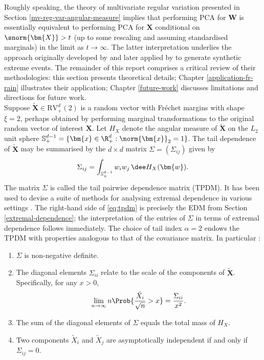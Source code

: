 \documentclass[en-GB, a4paper, nobind]{templates/bathreport}
\begin{document}
Roughly speaking, the theory of multivariate regular variation presented in Section \ref{mv-reg-var-angular-measure} implies that performing PCA for \(\bm{W}\) is essentially equivalent to performing PCA for \(\bm{X}\) conditional on \(\snorm{\bm{X}}>t\) (up to some rescaling and assuming standardised marginals) in the limit as \(t\to\infty\). The latter interpretation underlies the approach originally developed by \textcite{cooleyDecompositionsDependenceHighdimensional2019} and later applied by \textcite{rohrbeckSimulatingFloodEvent2021} to generate synthetic extreme events. The remainder of this report comprises a critical review of their methodologies: this section presents theoretical details; Chapter \ref{application-fr-rain} illustrates their application; Chapter \ref{future-work} discusses limitations and directions for future work.\\
Suppose \(\tilde{\bm{X}}\in\mathrm{RV}^d_+(2)\) is a random vector with Fréchet margins with shape \(\xi=2\), perhaps obtained by performing marginal transformations to the original random vector of interest \(\bm{X}\). Let \(H_X\) denote the angular measure of \(\tilde{\bm{X}}\) on the \(L_2\) unit sphere \(\mathbb{S}_+^{d-1}=\{\bm{x}\in\R^d_+:\norm{\bm{x}}_2=1\}\). The tail dependence of \(\tilde{\bm{X}}\) may be summarised by the \(d\times d\) matrix \(\Sigma=(\Sigma_{ij})\) given by
\begin{equation}
\Sigma_{ij} = \int_{\mathbb{S}_+^{d-1}} w_i w_j \,\dee H_X(\bm{w}).
\label{eq:tpdm}
\end{equation}
The matrix \(\Sigma\) is called the tail pairwise dependence matrix (TPDM). It has been used to devise a suite of methods for analysing extremal dependence in various settings \autocite{fixSimultaneousAutoregressiveModels2021,mhatreTransformedLinearModelsTime2021}. The right-hand side of \eqref{eq:tpdm} is precisely the EDM from Section \ref{extremal-dependence}; the interpretation of the entries of \(\Sigma\) in terms of extremal dependence follows immediately. The choice of tail index \(\alpha=2\) endows the TPDM with properties analogous to that of the covariance matrix. In particular \autocite[Section 4]{cooleyDecompositionsDependenceHighdimensional2019}:

\begin{enumerate}
\item $\Sigma$ is non-negative definite.
\item The diagonal elements $\Sigma_{ii}$ relate to the scale of the components of $\tilde{\bm{X}}$. Specifically, for any $x>0$,
\begin{equation*}
\lim_{n\to\infty} n\Prob{\frac{\tilde{X}_i}{\sqrt{n}}>x} = \frac{\Sigma_{ii}}{x^2}.
\end{equation*}
\item The sum of the diagonal elements of $\Sigma$ equals the total mass of $H_X$. 
\item Two components $\tilde{X}_i$ and $\tilde{X}_j$ are asymptotically independent if and only if $\Sigma_{ij}=0$.
\end{enumerate}
\end{document}

